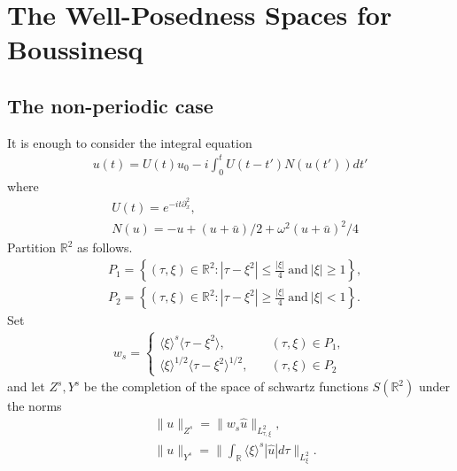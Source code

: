 \documentclass{amsart}
\newcommand{\rr}{\mathbb{R}}
\newcommand{\wh}{\widehat}
\newcommand{\p}{\partial}
\begin{document}
\section{The Well-Posedness Spaces for Boussinesq}
\subsection{The non-periodic case} 
\label{ssec:non-per-spaces}
It is enough to consider the integral equation
%
%
\begin{equation*}
\begin{split}
  u(t) = U(t) u_{0} -i \int_{0}^{t} U(t -t')N(u(t')) dt'
\end{split}
\end{equation*}
%
%
where 
%
%
\begin{equation*}
\begin{split}
  & U(t) = e^{-it \p_x^{2}},
  \\
  & N(u) = -u + (u + \bar{u})/2 + \omega^{2}(u + \bar{u})^{2}/4
\end{split}
\end{equation*}
%
%
Partition $\rr^{2}$ as follows.
%
%
\begin{equation*}
\begin{split}
  & P_{1} = \left\{ (\tau, \xi) \in \rr^{2}: | \tau - \xi^{2} | \le \frac{| \xi
  |}{4} \ \text{and} \ | \xi | \ge 1 \right\},
  \\
  & P_{2} = \left\{ (\tau, \xi) \in \rr^{2}: | \tau - \xi^{2} | \ge \frac{| \xi
  |}{4} \ \text{and} \ | \xi | < 1 \right\}.
\end{split}
\end{equation*}
%
%
Set
%
%
\begin{equation*}
\begin{split}
  w_{s} = 
  \begin{cases}
    \langle \xi \rangle ^{s} \langle \tau - \xi^{2} \rangle , \quad & (\tau,
    \xi) \in P_{1},
    \\
    \langle \xi \rangle ^{1/2} \langle \tau - \xi^{2} \rangle^{1/2}, \quad
    & (\tau, \xi) \in P_{2}
  \end{cases}
\end{split}
\end{equation*}
%
%
and let $Z^{s}, Y^{s}$ be the completion of the space of schwartz functions
$S(\rr^{2})$ under the norms
%
%
\begin{equation*}
\begin{split}
  & \| u \|_{Z^{s}} = \| w_{s} \wh{u} \|_{L^{2}_{\tau, \xi}},
  \\
  & \| u \|_{Y^{s}} = \| \int_{\rr} \langle \xi \rangle^{s} | \wh{u} | d \tau
  \|_{L^{2}_{\xi}}.
\end{split}
\end{equation*}
\end{document}
